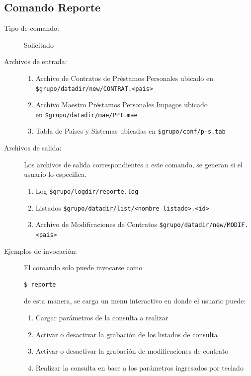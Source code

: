 \documentclass[12pt]{article}
\begin{document}
\subsection{Comando Reporte}
\begin{description}

	\item [Tipo de comando:] Solicitado
	
	\item [Archivos de entrada:]
		\begin{enumerate}
		\item Archivo de Contratos de Préstamos Personales ubicado en \verb|$grupo/datadir/new/CONTRAT.<pais>|
		\item Archivo Maestro Préstamos Personales Impagos ubicado \\ en \verb|$grupo/datadir/mae/PPI.mae|
		\item Tabla de Paises y Sistemas ubicadas en \verb|$grupo/conf/p-s.tab|
		\end{enumerate}

	\item [Archivos de salida:] Los archivos de salida correspondientes a este comando, se generan si el usuario lo especifica. 
		\begin{enumerate}
		\item Log  \verb|$grupo/logdir/reporte.log|
		\item Listados \verb|$grupo/datadir/list/<nombre listado>.<id>|
		\item Archivo de Modificaciones de Contratos \verb|$grupo/datadir/new/MODIF.<pais>|
		\end{enumerate}

	\item [Ejemplos de invocación:]	El comando solo puede invocarse como
	\begin{verbatim}$ reporte\end{verbatim}
	de esta manera, se carga un menu interactivo en donde el usuario puede:
		\begin{enumerate}
		\item Cargar parámetros de la consulta a realizar
		\item Activar o desactivar la grabación de los listados de consulta
		\item Activar o desactivar la grabación de modificaciones de contrato
		\item Realizar la consulta en base a los parámetros ingresados por teclado
		\end{enumerate}


\end{description}
\end{document}
